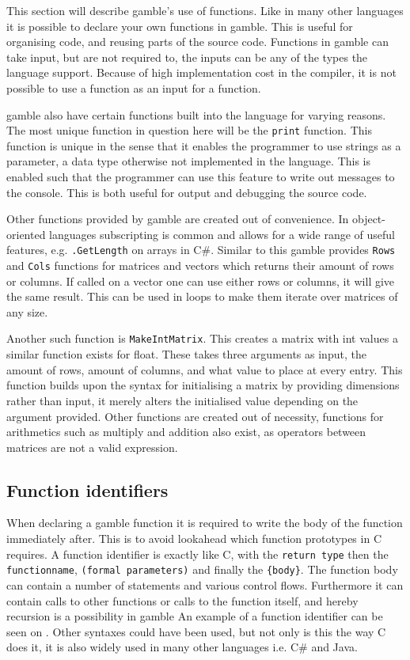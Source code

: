 This section will describe \gls{gamble}'s use of functions. 
Like in many other languages it is possible to declare your own functions in \gls{gamble}.
This is useful for organising code, and reusing parts of the source code.
Functions in \gls{gamble} can take input, but are not required to, the inputs can be any of the types the language support.
Because of high implementation cost in the compiler, it is not possible to use a function as an input for a function.

\gls{gamble} also have certain functions built into the language for varying reasons.
The most unique function in question here will be the \texttt{print} function.
This function is unique in the sense that it enables the programmer to use strings as a parameter, a data type otherwise not implemented in the language.
This is enabled such that the programmer can use this feature to write out messages to the console. 
This is both useful for output and debugging the source code.

Other functions provided by \gls{gamble} are created out of convenience.
In object-oriented languages subscripting is common and allows for a wide range of useful features, e.g. \texttt{.GetLength} on arrays in C\#.
Similar to this \gls{gamble} provides \texttt{Rows} and \texttt{Cols} functions for matrices and vectors which returns their amount of rows or columns.
If called on a vector one can use either rows or columns, it will give the same result.
This can be used in loops to make them iterate over matrices of any size.

Another such function is \texttt{MakeIntMatrix}.
This creates a matrix with int values a similar function exists for float.
These takes three arguments as input, the amount of rows, amount of columns, and what value to place at every entry.
This function builds upon the syntax for initialising a matrix by providing dimensions rather than input, it merely alters the initialised value depending on the argument provided.
Other functions are created out of necessity, functions for arithmetics such as multiply and addition also exist, as operators between matrices are not a valid expression.

\subsection*{Function identifiers}
When declaring a \gls{gamble} function it is required to write the body of the function immediately after.
This is to avoid lookahead which function prototypes in C requires.
A function identifier is exactly like C, with the \texttt{return type} then the \texttt{functionname}, \texttt{(formal parameters)} and finally the \texttt{\{body\}}.
The function body can contain a number of statements and various control flows.
Furthermore it can contain calls to other functions or calls to the function itself, and hereby recursion is a possibility in \gls{gamble}
An example of a function identifier can be seen on .
Other syntaxes could have been used, but not only is this the way C does it, it is also widely used in many other languages i.e. C\# and Java.


